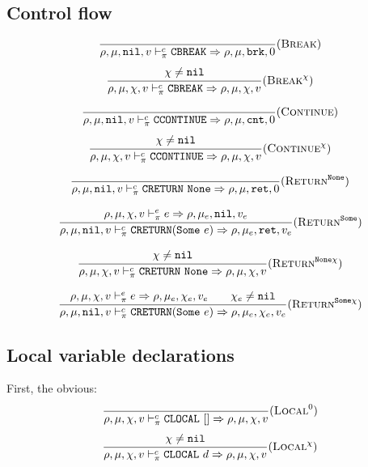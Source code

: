 \subsection{Control flow}
\[\dfrac{
}{\rho,\mu,\texttt{nil},v \vdash_\pi^c \texttt{CBREAK} \Rightarrow \rho,\mu,\texttt{brk},0} (\textsc{Break})\]
\[\dfrac{\begin{array}{c}
    \chi\ne\texttt{nil}
\end{array}}{\rho,\mu,\chi,v \vdash_\pi^c \texttt{CBREAK} \Rightarrow \rho,\mu,\chi,v} (\textsc{Break}^\chi)\]

\[\dfrac{
}{\rho,\mu,\texttt{nil},v \vdash_\pi^c \texttt{CCONTINUE} \Rightarrow \rho,\mu,\texttt{cnt},0} (\textsc{Continue})\]
\[\dfrac{\begin{array}{c}
    \chi\ne\texttt{nil}
\end{array}}{\rho,\mu,\chi,v \vdash_\pi^c \texttt{CCONTINUE} \Rightarrow \rho,\mu,\chi,v} (\textsc{Continue}^\chi)\]

\[\dfrac{
}{\rho,\mu,\texttt{nil},v \vdash_\pi^c \texttt{CRETURN}\ \texttt{None} \Rightarrow \rho,\mu,\texttt{ret},0} (\textsc{Return}^{\texttt{None}})\]

\[\dfrac{\begin{array}{c}
    \rho,\mu,\chi,v \vdash_\pi^e e \Rightarrow \rho,\mu_e,\texttt{nil},v_e
\end{array}}{\rho,\mu,\texttt{nil},v \vdash_\pi^c \texttt{CRETURN}(\texttt{Some}\ e) \Rightarrow \rho,\mu_e,\texttt{ret},v_e} (\textsc{Return}^{\texttt{Some}})\]

\[\dfrac{\begin{array}{c}
    \chi\ne\texttt{nil}
\end{array}}{\rho,\mu,\chi,v \vdash_\pi^c \texttt{CRETURN}\ \texttt{None} \Rightarrow \rho,\mu,\chi,v} (\textsc{Return}^{\texttt{None}\chi})\]

\[\dfrac{\begin{array}{c}
    \rho,\mu,\chi,v \vdash_\pi^e e \Rightarrow \rho,\mu_e,\chi_e,v_e \qquad \chi_e\ne\texttt{nil}
\end{array}}{\rho,\mu,\texttt{nil},v \vdash_\pi^c \texttt{CRETURN}(\texttt{Some}\ e) \Rightarrow \rho,\mu_e,\chi_e,v_e} (\textsc{Return}^{\texttt{Some}\chi})\]

\subsection{Local variable declarations}

First, the obvious:
\[\dfrac{\begin{array}{c}
\end{array}}{\rho,\mu,\chi,v \vdash_\pi^c \texttt{CLOCAL}\ [] \Rightarrow \rho,\mu,\chi,v} (\textsc{Local}^0)\]
\[\dfrac{\begin{array}{c}
    \chi\ne\texttt{nil}
\end{array}}{\rho,\mu,\chi,v \vdash_\pi^c \texttt{CLOCAL}\ d \Rightarrow \rho,\mu,\chi,v} (\textsc{Local}^\chi)\]

